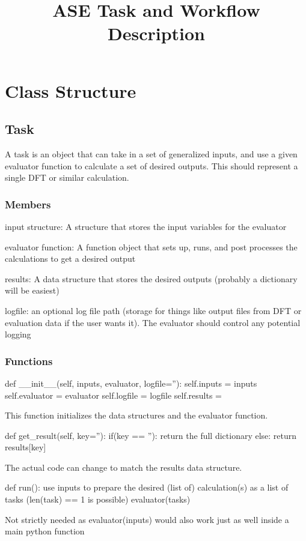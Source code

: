 \documentclass [notitlepage, 12pt, a4paper]{article}
\begin{document}
\title{ASE Task and Workflow Description}

\section{Class Structure}

\subsection{Task}
A task is an object that can take in a set of generalized inputs, and use a given evaluator function to calculate a set of desired outputs.
This should represent a single DFT or similar calculation.

\subsubsection{Members}
input structure: A structure that stores the input variables for the evaluator

evaluator function: A function object that sets up, runs, and post processes the calculations to get a desired output

results: A data structure that stores the desired outputs (probably a dictionary will be easiest)

logfile: an optional log file path (storage for things like output files from DFT or evaluation data if the user wants it). The evaluator should control any potential logging

\subsubsection{Functions}
\begin{python}
def __init__(self, inputs, evaluator, logfile=''):
    self.inputs = inputs
    self.evaluator = evaluator
    self.logfile = logfile
    self.results = {}
\end{python}
This function initializes the data structures and the evaluator function.

\begin{python}
def get_result(self, key=''):
    if(key == ''):
        return the full dictionary
    else:
        return results[key]
\end{python}
The actual code can change to match the results data structure.

\begin{python}
def run():
	use inputs to prepare the desired (list of) 
	calculation(s) as a list of tasks 
	(len(task) == 1 is possible)
    evaluator(tasks)
\end{python}
Not strictly needed as evaluator(inputs) would also work just as well inside a main python function
\end{document}
